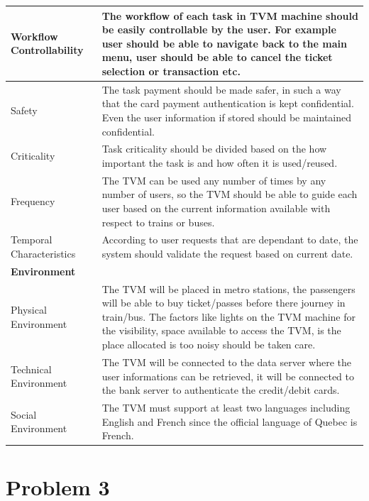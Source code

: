 \documentclass[a4paper,12pt]{report}
\begin{document}
\setlength{\tabcolsep}{18pt}
\renewcommand{\arraystretch}{1.5}
\begin{tabular}[H]{ |p{3cm}|p{12cm}| }
	\hline
	Workflow Controllability & The workflow of each task in TVM machine should be easily controllable by the user. For example user should be able to navigate back to the main menu, user should be able to cancel the ticket selection or transaction etc.\\
	\hline
	Safety & 
	The task payment should be made safer, in such a way that the card payment authentication is kept confidential. Even the user information if stored should be maintained confidential.\\
	\hline
	Criticality & 
	Task criticality should be divided based on the how important the task is and how often it is used/reused.\\
	\hline
	Frequency & 
	The TVM can be used any number of times by any number of users, so the TVM should be able to guide each user based on the current information available with respect to trains or buses.\\
	\hline
	Temporal Characteristics & 
	According to user requests that are dependant to date, the system should validate the request based on current date. \\
	\hline
	\textbf{Environment} & \\
	\hline
	Physical Environment & 
	The TVM will be placed in metro stations, the passengers will be able to buy ticket/passes before there journey in train/bus. The factors like lights on the TVM machine for the visibility, space available to access the TVM, is the place allocated is too noisy should be taken care. \\
	\hline
	Technical Environment & 
	The TVM will be connected to the data server where the user informations can be retrieved, it will be connected to the bank server to authenticate the credit/debit cards. \\
	\hline
	Social Environment & 
	The TVM must support at least two languages including English and French since the official language of Quebec is French. \\
	\hline
\end{tabular}


%
%

\newpage


\section{Problem 3}
\end{document}
